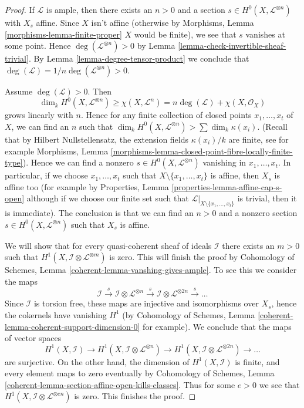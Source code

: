 \documentclass[10pt,a4paper]{amsart}
\theoremstyle{plain}
\theoremstyle{definition}
\theoremstyle{remark}
\numberwithin{equation}{subsection}
\begin{document}
\begin{proof}
If $\mathcal{L}$ is ample, then there exists an $n > 0$ and a section
$s \in H^0(X, \mathcal{L}^{\otimes n})$ with $X_s$ affine. Since
$X$ isn't affine (otherwise by
Morphisms, Lemma \ref{morphisms-lemma-finite-proper}
$X$ would be finite), we see that $s$ vanishes at some point.
Hence $\deg(\mathcal{L}^{\otimes n}) > 0$ by
Lemma \ref{lemma-check-invertible-sheaf-trivial}.
By Lemma \ref{lemma-degree-tensor-product}
we conclude that $\deg(\mathcal{L}) = 1/n\deg(\mathcal{L}^{\otimes n}) > 0$.

\medskip\noindent
Assume $\deg(\mathcal{L}) > 0$. Then
$$
\dim_k H^0(X, \mathcal{L}^{\otimes n}) \geq \chi(X, \mathcal{L}^n)
= n\deg(\mathcal{L}) + \chi(X, \mathcal{O}_X)
$$
grows linearly with $n$. Hence for any finite collection of closed
points $x_1, \ldots, x_t$ of $X$, we can find an $n$ such that
$\dim_k H^0(X, \mathcal{L}^{\otimes n}) > \sum \dim_k \kappa(x_i)$.
(Recall that by Hilbert Nullstellensatz, the extension fields
$\kappa(x_i)/k$ are finite, see for example
Morphisms, Lemma \ref{morphisms-lemma-closed-point-fibre-locally-finite-type}).
Hence we can find a nonzero $s \in H^0(X, \mathcal{L}^{\otimes n})$
vanishing in $x_1, \ldots, x_t$. In particular, if we choose
$x_1, \ldots, x_t$ such that $X \setminus \{x_1, \ldots, x_t\}$
is affine, then $X_s$ is affine too
(for example by Properties, Lemma \ref{properties-lemma-affine-cap-s-open}
although if we choose our finite set such that
$\mathcal{L}|_{X \setminus \{x_1, \ldots, x_t\}}$ is trivial, then
it is immediate). The conclusion is that we can find an $n > 0$
and a nonzero section $s \in H^0(X, \mathcal{L}^{\otimes n})$ such
that $X_s$ is affine.

\medskip\noindent
We will show that for every quasi-coherent sheaf of ideals $\mathcal{I}$
there exists an $m > 0$ such that
$H^1(X, \mathcal{I} \otimes \mathcal{L}^{\otimes m})$ is zero.
This will finish the proof by
Cohomology of Schemes, Lemma \ref{coherent-lemma-vanshing-gives-ample}.
To see this we consider the maps
$$
\mathcal{I} \xrightarrow{s}
\mathcal{I} \otimes \mathcal{L}^{\otimes n} \xrightarrow{s}
\mathcal{I} \otimes \mathcal{L}^{\otimes 2n} \xrightarrow{s} \ldots
$$
Since $\mathcal{I}$ is torsion free, these maps are injective and
isomorphisms over $X_s$, hence the cokernels have vanishing $H^1$
(by Cohomology of Schemes, Lemma
\ref{coherent-lemma-coherent-support-dimension-0} for example).
We conclude that the maps of vector spaces
$$
H^1(X, \mathcal{I}) \to
H^1(X, \mathcal{I} \otimes \mathcal{L}^{\otimes n}) \to
H^1(X, \mathcal{I} \otimes \mathcal{L}^{\otimes 2n}) \to \ldots
$$
are surjective. On the other hand, the dimension of $H^1(X, \mathcal{I})$
is finite, and every element maps to zero eventually by
Cohomology of Schemes, Lemma
\ref{coherent-lemma-section-affine-open-kills-classes}.
Thus for some $e > 0$ we see that
$H^1(X, \mathcal{I} \otimes \mathcal{L}^{\otimes en})$ is zero.
This finishes the proof.
\end{proof}
\end{document}

